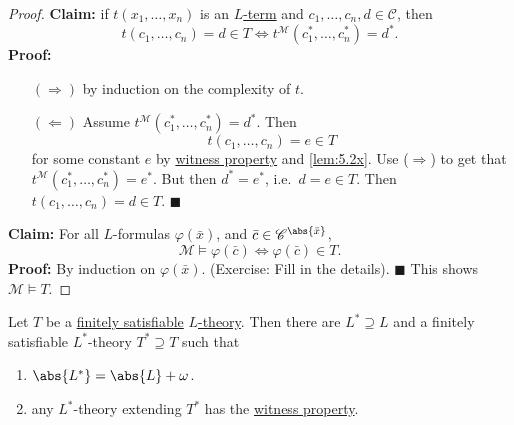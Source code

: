 \documentclass{article}
\let\models\vDash
\begin{document}
\begin{proof}
  \textbf{Claim:} if $t(x_1, \dotsc, x_n)$ is an \hyperlink{def:lterm}{$L$-term} and $c_1, \dotsc, c_n, d \in \mathscr{C}$, then
  \begin{equation*}
    t(c_1, \dotsc, c_n) = d \in T \iff t^\mathcal{M}(c_1^*, \dotsc, c_n^*) = d^*.
  \end{equation*}
  \textbf{Proof:}
  \begin{itemize}
    \item [$(\Rightarrow)$] by induction on the complexity of $t$.
    \item [$(\Leftarrow)$] Assume $t^\mathcal{M}(c_1^*, \dotsc, c_n^*) = d^*$.
    Then
    \begin{equation*}t(c_1, \dotsc, c_n) = e \in T\end{equation*}
    for some constant $e$ by \hyperlink{def:wp}{witness property} and \cref{lem:5.2x}.
    Use ($\Rightarrow$) to get that $t^\mathcal{M}(c_1^*, \dotsc, c_n^*) = e^*$.
    But then $d^* = e^*$, i.e.\ $d = e \in T$.
    Then $t(c_1, \dotsc, c_n) = d \in T$. $\blacksquare$
  \end{itemize}

  \textbf{Claim:} For all $L$-formulas $\varphi(\bar{x})$, and $\bar{c} \in \mathscr{C}^{\abs{\bar{x}}}$,
  \begin{equation*}
    \mathcal{M} \models \varphi(\bar{c}) \iff \varphi(\bar{c}) \in T.
  \end{equation*}
  \textbf{Proof:} By induction on $\varphi(\bar{x})$. (Exercise: Fill in the details).  $\blacksquare$
  This shows $\mathcal{M} \models T$.
\end{proof}
\begin{nlemma}\label{lem:5.4x}
  Let $T$ be a \hyperlink{def:fs}{finitely satisfiable} \hyperlink{def:ltheory}{$L$-theory}.
  Then there are $L^* \supseteq L$ and a finitely satisfiable $L^*$-theory $T^* \supseteq T$ such that
  \begin{enumerate}[label=(\roman*)]
    \item $\abs{L^*} = \abs{L} + \omega$.
    \item any $L^*$-theory extending $T^*$ has the \hyperlink{def:wp}{witness property}.
  \end{enumerate}
\end{nlemma}
\end{document}
